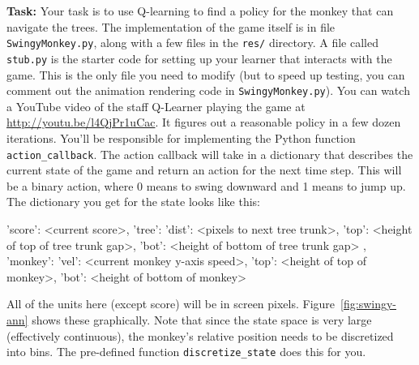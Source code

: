 \documentclass[submit]{harvardml}
\begin{document}
\begin{problem}
\textbf{Task:}
Your task is to use Q-learning to find a policy for the monkey that can navigate the trees.  The implementation of the game itself is in file \verb|SwingyMonkey.py|, along with a few files in the \verb|res/| directory.  A file called \verb|stub.py| is the starter code for setting up your learner that interacts with the game.  This is the only file you need to modify (but to speed up testing, you can comment out the animation rendering code in \verb|SwingyMonkey.py|). You can watch a YouTube video of the staff Q-Learner playing the game at \url{http://youtu.be/l4QjPr1uCac}.  It figures out a reasonable policy in a few dozen iterations.
You'll be responsible for implementing the Python function  \verb|action_callback|. The action callback will take in a dictionary that describes the current state of the game and return an action for the next time step.  This will be a binary action, where 0 means to swing downward and 1 means to jump up.  The dictionary you get for the state looks like this:
\begin{csv}
{ 'score': <current score>,
  'tree': { 'dist': <pixels to next tree trunk>,
            'top':  <height of top of tree trunk gap>,
            'bot':  <height of bottom of tree trunk gap> },
  'monkey': { 'vel': <current monkey y-axis speed>,
              'top': <height of top of monkey>,
              'bot': <height of bottom of monkey> }}
\end{csv}
All of the units here (except score) will be in screen pixels. Figure~\ref{fig:swingy-ann} shows these graphically. 
Note that since the state space is very large (effectively continuous), the monkey's relative position needs to be discretized into bins. The pre-defined function \verb|discretize_state| does this for you.


\end{problem}
\end{document}
